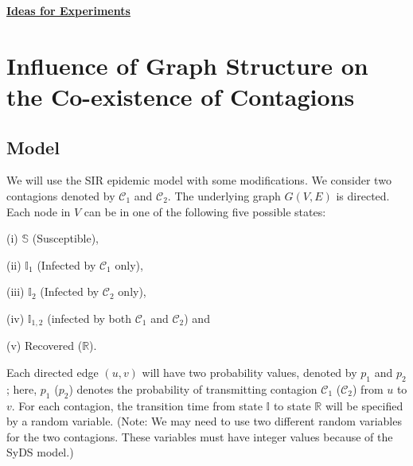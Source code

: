 \documentclass[11pt]{article}
\begin{document}
\newtheorem{theorem}{Theorem}[section]
\newtheorem{lemma}{Lemma}[section]
\newtheorem{corollary}{Corollary}[section]
\newtheorem{fact}{Fact}[section]
\newtheorem{definition}{Definition}[section]
\newtheorem{proposition}{Proposition}[section]
\newtheorem{observation}{Observation}[section]
\newtheorem{claim}{Claim}[section]

\newcommand{\cnp}{\textbf{NP}}
\newcommand{\true}{\texttt{True}}
\newcommand{\false}{\texttt{False}}

\newcommand{\QED}{\hfill\rule{2mm}{2mm}}

\newcommand{\irange}{\mbox{$1 \leq i \leq n$}}
\newcommand{\jrange}{\mbox{$1 \leq j \leq m$}}

\newcommand{\dunder}[1]{\underline{\underline{#1}}}

\setlength{\parskip}{3pt}

\normalbaselineskip

\newcommand{\cone}{\mbox{$\mathcal{C}_1$}}
\newcommand{\ctwo}{\mbox{$\mathcal{C}_2$}}


\newcommand{\sstate}{\mbox{$\mathbb{S}$}}
\newcommand{\istate}{\mbox{$\mathbb{I}$}}
\newcommand{\rstate}{\mbox{$\mathbb{R}$}}

\begin{center}
\dunder{\Large{\textbf{Ideas for Experiments}}}
\end{center}

\medskip

\section{Influence of Graph Structure on the Co-existence of Contagions} 

\subsection{Model}

We will use the SIR epidemic model with some modifications.
We consider two contagions denoted by \cone{} and \ctwo. The underlying
graph $G(V,E)$ is directed. Each node in $V$
can be in one of the following five possible states: 
\begin{description}
\item{(i)} \sstate{} (Susceptible), 
\item{(ii)} $\istate_{1}$ (Infected by \cone{} only),
\item{(iii)} $\istate_{2}$ (Infected by \ctwo{} only), 
\item{(iv)} $\istate_{1,2}$ (infected by both \cone{} and \ctwo) and 
\item{(v)} Recovered (\rstate). 
\end{description}
Each directed edge $(u,v)$  will have two probability values, denoted by $p_1$
and $p_2$; here, $p_1$ ($p_2$) denotes the probability of transmitting contagion
\cone{} (\ctwo) from $u$ to $v$.
For each contagion, the transition time from state
\istate{} to state \rstate{} will be specified by a random
variable. 
(Note: We may need to use two different random variables
for the two contagions. These variables must have integer values 
because of the SyDS model.) 
\end{document}
